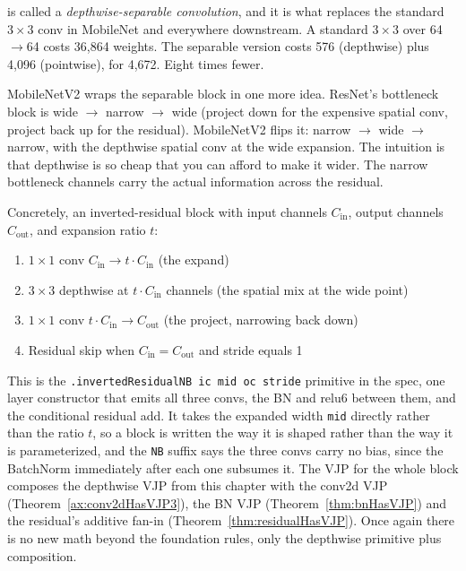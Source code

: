 is called a \emph{depthwise-separable convolution}, and it is what
replaces the standard \(3 \times 3\) conv in MobileNet and
everywhere downstream. A standard \(3 \times 3\) over 64$\to$64
costs 36{,}864 weights. The separable version costs 576 (depthwise)
plus 4{,}096 (pointwise), for 4{,}672. Eight times fewer.


MobileNetV2 wraps the separable block in one more idea. ResNet's
bottleneck block is wide $\to$ narrow $\to$ wide (project down for
the expensive spatial conv, project back up for the residual).
MobileNetV2 flips it: narrow $\to$ wide $\to$ narrow, with
the depthwise spatial conv at the wide expansion. The intuition
is that depthwise is so cheap that you can afford to make it
wider. The narrow bottleneck channels carry the actual
information across the residual.

Concretely, an inverted-residual block with input channels \(C_\text{in}\),
output channels \(C_\text{out}\), and expansion ratio \(t\):

\begin{enumerate}
\item \(1 \times 1\) conv \(C_\text{in} \to t \cdot C_\text{in}\)
  (the expand)
\item \(3 \times 3\) depthwise at \(t \cdot C_\text{in}\) channels
  (the spatial mix at the wide point)
\item \(1 \times 1\) conv \(t \cdot C_\text{in} \to C_\text{out}\)
  (the project, narrowing back down)
\item Residual skip when \(C_\text{in} = C_\text{out}\) and stride
  equals 1
\end{enumerate}

This is the \texttt{.invertedResidualNB ic mid oc stride} primitive
in the spec, one layer constructor that emits all three convs, the
BN and relu6 between them, and the conditional residual add. It
takes the expanded width \texttt{mid} directly rather than the ratio
\(t\), so a block is written the way it is shaped rather than the way
it is parameterized, and the \texttt{NB} suffix says the three convs
carry no bias, since the BatchNorm immediately after each one
subsumes it. The VJP for the whole block composes the depthwise VJP
from this chapter with the conv2d VJP (Theorem~\ref{ax:conv2dHasVJP3}), the BN VJP
(Theorem~\ref{thm:bnHasVJP}) and the residual's additive fan-in
(Theorem~\ref{thm:residualHasVJP}). Once again there is no new math beyond
the foundation rules, only the depthwise primitive plus composition.


